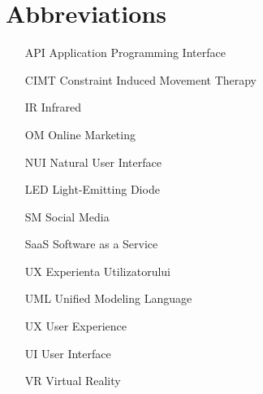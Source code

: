 \section*{Abbreviations}

\begin{itemize}[leftmargin=2cm, topsep=0pt, partopsep=5pt,itemsep=0pt,parsep=0pt]
\item [API] Application Programming Interface
\item [CIMT] Constraint Induced Movement Therapy
\item [IR] Infrared
\item[OM] Online Marketing
\item [NUI] Natural User Interface
\item [LED] Light-Emitting Diode
\item[SM] Social Media
\item [SaaS] Software as a Service
\item[UX] Experienta Utilizatorului
\item[UML] Unified Modeling Language
\item[UX] User Experience
\item[UI] User Interface
\item[VR] Virtual Reality
\end{itemize}